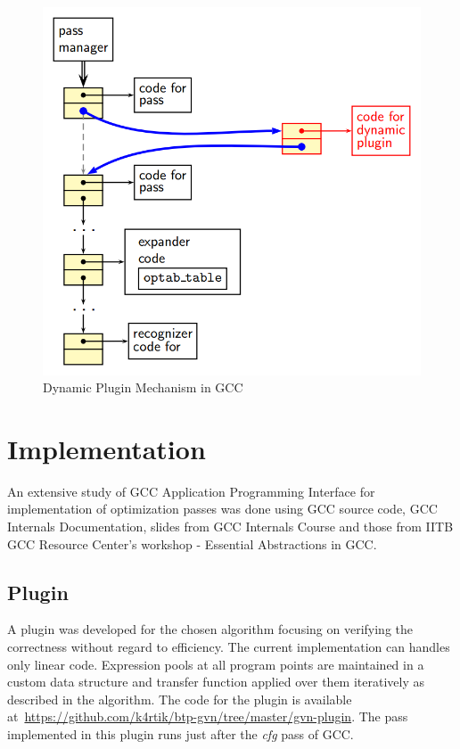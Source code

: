 \begin{figure}[htb]
\centering
\includegraphics[scale=0.65]{./dynamic-plugin1}
\caption{Dynamic Plugin Mechanism in GCC\cite{grc}}
\label{fig:dynamic-plugin}
\end{figure}

\pagebreak
\section{Implementation}
An extensive study of GCC Application Programming Interface for implementation of optimization passes was done using GCC source code, GCC Internals Documentation\cite{gccint}, slides from GCC Internals Course\cite{dnovillo} and those from IITB GCC Resource Center's workshop - Essential Abstractions in GCC\cite{grc}.

\subsection{Plugin}
A plugin was developed for the chosen algorithm focusing on verifying the correctness without regard to efficiency. The current implementation can handles only linear code. Expression pools at all program points are maintained in a custom data structure and transfer function applied over them iteratively as described in the algorithm\cite{sagvn}. The code for the plugin is available at\ \url{https://github.com/k4rtik/btp-gvn/tree/master/gvn-plugin}. The pass implemented in this plugin runs just after the \emph{cfg} pass of GCC.

